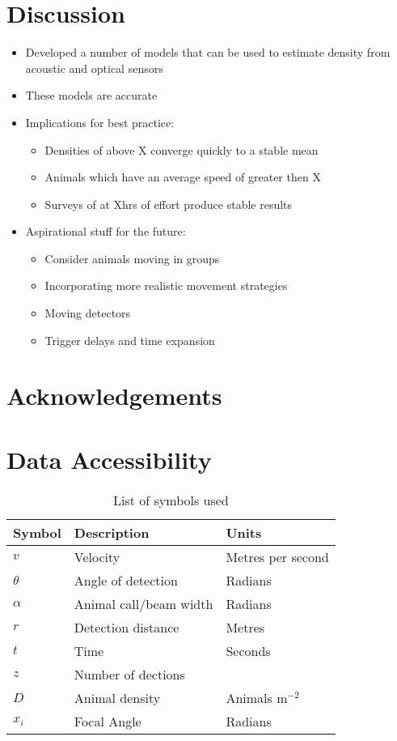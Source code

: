 \documentclass[a4paper,10pt,reqno,oneside]{amsart}
\begin{document}
\section{Discussion}
\begin{itemize}
\item Developed a number of models that can be used to estimate density from acoustic and optical sensors 
\item These models are accurate 
\item Implications for best practice:
	\begin{itemize}
	\item Densities of above X converge quickly to a stable mean
	\item Animals which have an average speed of greater then X 
	\item Surveys of at Xhrs of effort produce stable results
	\end{itemize}
\item Aspirational stuff for the future:
	\begin{itemize}
	\item Consider animals moving in groups
	\item Incorporating more realistic movement strategies
	\item Moving detectors
	\item Trigger delays and time expansion
	\end{itemize}
\end{itemize}




\section{Acknowledgements}

\section{Data Accessibility}






\begin{table}[t]
\centering
\begin{tabular}{lll}
Symbol 	& Description & Units\\\hline
$v$		& Velocity & Metres per second\\
$\theta$	& Angle of detection & Radians \\
$\alpha$	& Animal call/beam width & Radians \\
$r$ 		& Detection distance & Metres\\
$t$			& Time & Seconds\\
$z$			& Number of dections & \\
$D$		& Animal density & Animals m$^{-2}$ \\
$x_i$	& Focal Angle 	& Radians\\
\end{tabular}
\caption{List of symbols used}
\label{t:paras}
\end{table}



	
	
\end{document}
